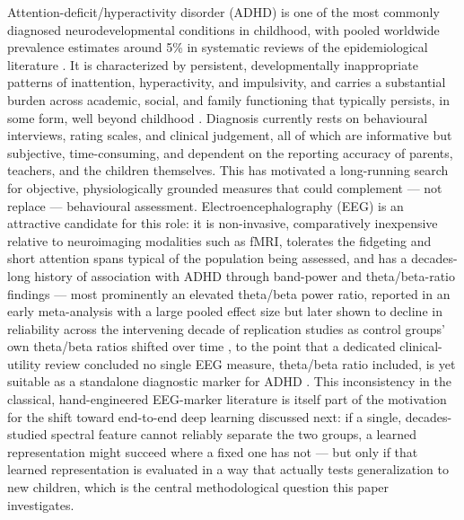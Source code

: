 \documentclass[a4paper,fleqn]{cas-sc}
\begin{document}
Attention-deficit/hyperactivity disorder (ADHD) is one of the most commonly diagnosed neurodevelopmental conditions in childhood, with pooled worldwide prevalence estimates around 5\% in systematic reviews of the epidemiological literature \cite{polanczyk2007worldwide}. It is characterized by persistent, developmentally inappropriate patterns of inattention, hyperactivity, and impulsivity, and carries a substantial burden across academic, social, and family functioning that typically persists, in some form, well beyond childhood \cite{thapar2016attention,faraone2015attention}. Diagnosis currently rests on behavioural interviews, rating scales, and clinical judgement, all of which are informative but subjective, time-consuming, and dependent on the reporting accuracy of parents, teachers, and the children themselves. This has motivated a long-running search for objective, physiologically grounded measures that could complement --- not replace --- behavioural assessment. Electroencephalography (EEG) is an attractive candidate for this role: it is non-invasive, comparatively inexpensive relative to neuroimaging modalities such as fMRI, tolerates the fidgeting and short attention spans typical of the population being assessed, and has a decades-long history of association with ADHD through band-power and theta/beta-ratio findings --- most prominently an elevated theta/beta power ratio, reported in an early meta-analysis with a large pooled effect size \cite{snyder2006metaanalysis} but later shown to decline in reliability across the intervening decade of replication studies as control groups' own theta/beta ratios shifted over time \cite{arns2013decade}, to the point that a dedicated clinical-utility review concluded no single EEG measure, theta/beta ratio included, is yet suitable as a standalone diagnostic marker for ADHD \cite{loo2012clinical}. This inconsistency in the classical, hand-engineered EEG-marker literature is itself part of the motivation for the shift toward end-to-end deep learning discussed next: if a single, decades-studied spectral feature cannot reliably separate the two groups, a learned representation might succeed where a fixed one has not --- but only if that learned representation is evaluated in a way that actually tests generalization to new children, which is the central methodological question this paper investigates.
\end{document}
